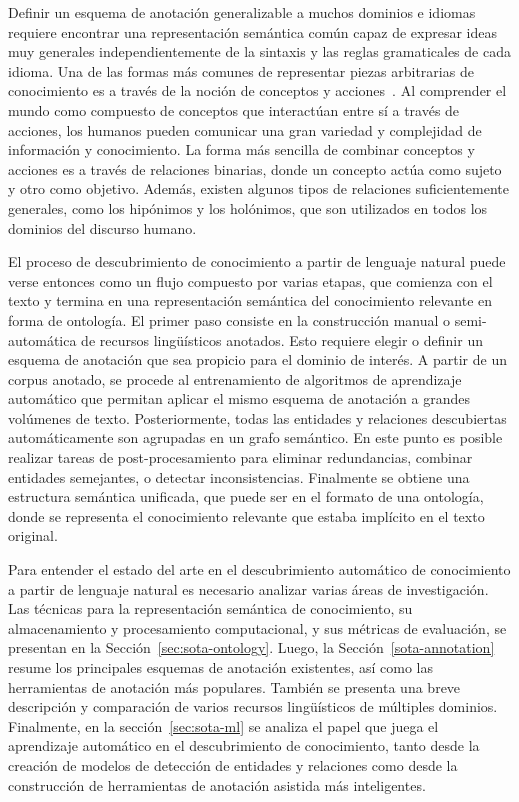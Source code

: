 Definir un esquema de anotación generalizable a muchos dominios e idiomas requiere encontrar una representación semántica común capaz de expresar ideas muy generales independientemente de la sintaxis y las reglas gramaticales de cada idioma.
Una de las formas más comunes de representar piezas arbitrarias de conocimiento es a través de la noción de conceptos y acciones~\cite{teleologies}.
Al comprender el mundo como compuesto de conceptos que interactúan entre sí a través de acciones, los humanos pueden comunicar una gran variedad y complejidad de información y conocimiento.
La forma más sencilla de combinar conceptos y acciones es a través de relaciones binarias, donde un concepto actúa como sujeto y otro como objetivo.
Además, existen algunos tipos de relaciones suficientemente generales, como los hipónimos y los holónimos, que son utilizados en todos los dominios del discurso humano.

El proceso de descubrimiento de conocimiento a partir de lenguaje natural puede verse entonces como un flujo compuesto por varias etapas, que comienza con el texto y termina en una representación semántica del conocimiento relevante en forma de ontología.
El primer paso consiste en la construcción manual o semi-automática de recursos lingüísticos anotados.
Esto requiere elegir o definir un esquema de anotación que sea propicio para el dominio de interés.
A partir de un corpus anotado, se procede al entrenamiento de algoritmos de aprendizaje automático que permitan aplicar el mismo esquema de anotación a grandes volúmenes de texto.
Posteriormente, todas las entidades y relaciones descubiertas automáticamente son agrupadas en un grafo semántico.
En este punto es posible realizar tareas de post-procesamiento para eliminar redundancias, combinar entidades semejantes, o detectar inconsistencias.
Finalmente se obtiene una estructura semántica unificada, que puede ser en el formato de una ontología, donde se representa el conocimiento relevante que estaba implícito en el texto original.

Para entender el estado del arte en el descubrimiento automático de conocimiento a partir de lenguaje natural es necesario analizar varias áreas de investigación.
Las técnicas para la representación semántica de conocimiento, su almacenamiento y procesamiento computacional, y sus métricas de evaluación, se presentan en la Sección~\ref{sec:sota-ontology}.
Luego, la Sección~\ref{sota-annotation} resume los principales esquemas de anotación existentes, así como las herramientas de anotación más populares. También se presenta una breve descripción y comparación de varios recursos lingüísticos de múltiples dominios.
Finalmente, en la sección~\ref{sec:sota-ml} se analiza el papel que juega el aprendizaje automático en el descubrimiento de conocimiento, tanto desde la creación de modelos de detección de entidades y relaciones como desde la construcción de herramientas de anotación asistida más inteligentes.

